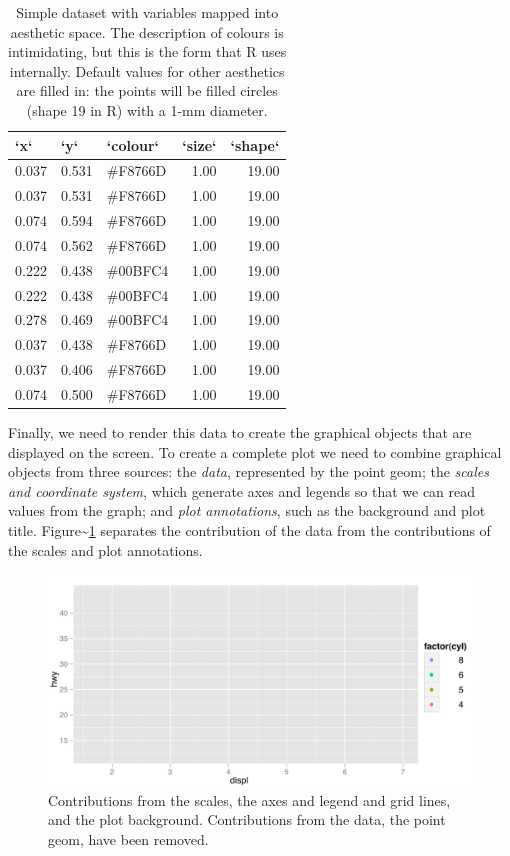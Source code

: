 \begin{table}[ht]
\centering
\begin{tabular}{lllrr}
  \hline
`x` & `y` & `colour` & `size` & `shape` \\ 
  \hline
0.037 & 0.531 & \color{f8766d} \#F8766D & 1.00 & 19.00 \\ 
  0.037 & 0.531 & \color{f8766d} \#F8766D & 1.00 & 19.00 \\ 
  0.074 & 0.594 & \color{f8766d} \#F8766D & 1.00 & 19.00 \\ 
  0.074 & 0.562 & \color{f8766d} \#F8766D & 1.00 & 19.00 \\ 
  0.222 & 0.438 & \color{00bfc4} \#00BFC4 & 1.00 & 19.00 \\ 
  0.222 & 0.438 & \color{00bfc4} \#00BFC4 & 1.00 & 19.00 \\ 
  0.278 & 0.469 & \color{00bfc4} \#00BFC4 & 1.00 & 19.00 \\ 
  0.037 & 0.438 & \color{f8766d} \#F8766D & 1.00 & 19.00 \\ 
  0.037 & 0.406 & \color{f8766d} \#F8766D & 1.00 & 19.00 \\ 
  0.074 & 0.500 & \color{f8766d} \#F8766D & 1.00 & 19.00 \\ 
   \hline
\end{tabular}
\caption{Simple dataset with variables mapped into aesthetic space. The description of colours is intimidating, but this is the form that R uses internally. Default values for other aesthetics are filled in: the points will be filled circles (shape 19 in R) with a 1-mm diameter.} 
\label{tbl:scaled}
\end{table}

Finally, we need to render this data to create the graphical objects
that are displayed on the screen. To create a complete plot we need to
combine graphical objects from three sources: the \emph{data},
represented by the point geom; the \emph{scales and coordinate system},
which generate axes and legends so that we can read values from the
graph; and \emph{plot annotations}, such as the background and plot
title. Figure\textasciitilde{}\ref{fig:empty} separates the contribution
of the data from the contributions of the scales and plot annotations.

\begin{figure}[htbp]
  \centering
  \includegraphics[width=0.8\linewidth]{diagrams/empty}
  \caption{Contributions from the scales, the axes and legend and grid lines, and the plot background.  Contributions from the data, the point geom, have been removed.}
  \label{fig:empty}
\end{figure}

